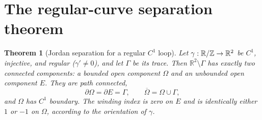 \documentclass[11pt,oneside]{book}
\newtheorem{theorem}{Theorem}[chapter]
\theoremstyle{definition}
\theoremstyle{remark}\newtheorem{remark}[theorem]{Remark}
\newcommand{\R}{\mathbb R}\newcommand{\C}{\mathbb C}
\begin{document}
\section{The regular-curve separation theorem}
\begin{theorem}[Jordan separation for a regular $C^1$ loop]\label{d13:21:smooth-jordan}
Let $\gamma:\R/\Z\to\R^2$ be $C^1$, injective, and regular
($\gamma'\ne0$), and let $\Gamma$ be its trace. Then
$\R^2\setminus\Gamma$ has exactly two connected components:
a bounded open component $\Omega$ and an unbounded open component $E$.
They are path connected,
\[
 \partial\Omega=\partial E=\Gamma,
 \qquad \overline\Omega=\Omega\cup\Gamma,
\]
and $\Omega$ has $C^1$ boundary. The winding index is zero on $E$
and is identically either $1$ or $-1$ on $\Omega$, according to the
orientation of $\gamma$.
\end{theorem}
\end{document}
